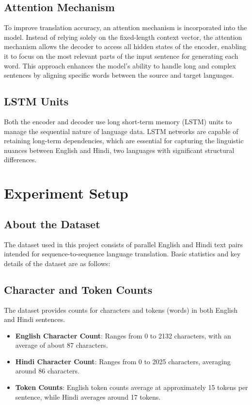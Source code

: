 \documentclass[12pt]{article}
\begin{document}
\subsection{Attention Mechanism}
To improve translation accuracy, an attention mechanism is incorporated into the model. Instead of relying solely on the fixed-length context vector, the attention mechanism allows the decoder to access all hidden states of the encoder, enabling it to focus on the most relevant parts of the input sentence for generating each word. This approach enhances the model's ability to handle long and complex sentences by aligning specific words between the source and target languages.

\subsection{LSTM Units}
Both the encoder and decoder use long short-term memory (LSTM) units to manage the sequential nature of language data. LSTM networks are capable of retaining long-term dependencies, which are essential for capturing the linguistic nuances between English and Hindi, two languages with significant structural differences.

\section{Experiment Setup}

\subsection{About the Dataset}

The dataset used in this project consists of parallel English and Hindi text pairs intended for sequence-to-sequence language translation. Basic statistics and key details of the dataset are as follows:

\subsection*{Character and Token Counts}
The dataset provides counts for characters and tokens (words) in both English and Hindi sentences.
\begin{itemize}
    \item \textbf{English Character Count}: Ranges from 0 to 2132 characters, with an average of about 87 characters.
    \item \textbf{Hindi Character Count}: Ranges from 0 to 2025 characters, averaging around 86 characters.
    \item \textbf{Token Counts}: English token counts average at approximately 15 tokens per sentence, while Hindi averages around 17 tokens.
\end{itemize}
\end{document}
